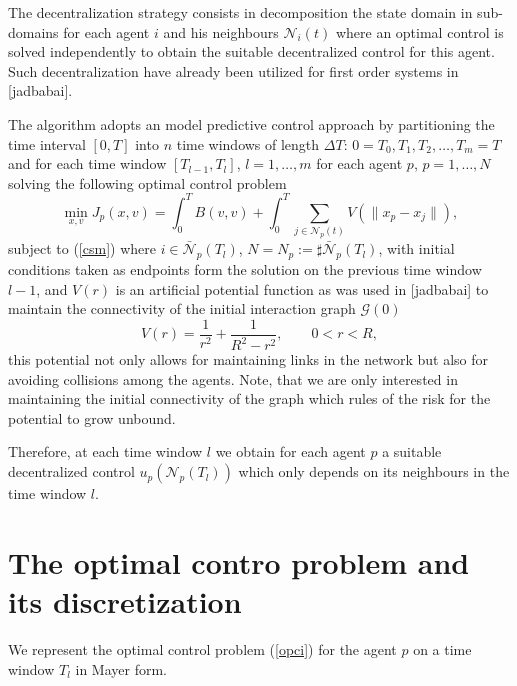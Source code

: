 \documentclass[a4paper,10pt, english]{article}
\begin{document}
The decentralization strategy consists in decomposition the state domain in sub-domains for each agent $i$ and his neighbours $\mathcal{N}_i(t)$ where  an optimal control is solved independently to obtain the suitable decentralized control for this agent. Such decentralization have already been utilized for first order systems in [jadbabai].

 The algorithm adopts an model predictive control approach by partitioning the time interval $[0, T]$ into $n$ time windows of length $\Delta T$: $0 = T_0, T_1, T_2, \dots, T_m = T$ and for each time window  $[T_{l-1}, T_{l}]$, $l = 1, \dots, m$ for each agent $p$, $p = 1, \dots, N$  solving the following optimal control problem
\begin{equation}
 \min_{x, v} J_p(x, v) = \int_{0}^{T}B(v, v) + \int_{0}^{T}\sum_{j\in \mathcal{N}_p(t)} V(\|x_p - x_j\|),
\label{opci}
\end{equation}
subject to (\ref{csm}) where $i \in \bar{\mathcal{N}}_p(T_l)$,  $N = N_p:= \sharp \bar{\mathcal{N}}_p(T_l)$, with initial conditions taken as endpoints form the solution on the previous time window $l-1$,  and $V(r)$ is an artificial potential function  as was used in [jadbabai] to maintain the connectivity of the initial interaction graph $\mathcal{G}(0)$ 
\begin{equation}
 V(r) = \frac{1}{r^2} + \frac{1}{R^2 - r^2}, \qquad 0 < r < R,
\label{potential}
\end{equation}
this potential not only allows for maintaining links in the network but also for avoiding collisions among the agents. Note, that we are only interested in maintaining the initial connectivity of the graph which rules of the risk for the potential to grow unbound.

 Therefore, at each time window $l$ we obtain for each agent $p$ a suitable decentralized control $u_p(\mathcal{N}_p(T_l))$ which only depends on its neighbours in the time window $l$.
 
 
 \section{The optimal contro problem and its discretization}
 
 We represent the optimal control problem (\ref{opci}) for the agent $p$ on a time window $T_l$ in Mayer form.
 
\end{document}
